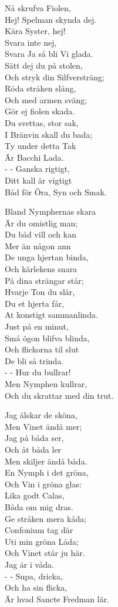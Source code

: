 \vspace{10pt}
Nå skrufva Fiolen,\\
Hej! Spelman skynda dej.\\
Kära Syster, hej!\\
Svara inte nej,\\
Svara Ja så bli Vi glada.\\
Sätt dej du på stolen,\\
Och stryk din Silfversträng;\\
Röda stråken släng,\\
Och med armen sväng;\\
Gör ej fiolen skada.\\
Du svettas, stor sak,\\
I Bränvin skall du bada;\\
Ty under detta Tak\\
Är Bacchi Lada.\\
-  -  Ganska rigtigt,\\
Ditt kall är vigtigt\\
Båd för Öra, Syn och Smak.\par
\vspace{10pt}
Bland Nymphernas skara\\
Är du omistlig man;\\
Du båd vill och kan\\
Mer än någon ann\\
De unga hjertan binda,\\
Och kärlekens snara\\
På dina strängar står;\\
Hvarje Ton du slår,\\
Du et hjerta får,\\
At konstigt sammanlinda.\\
Just på en minut,\\
Små ögon blifva blinda,\\
Och flickorna til slut\\
De bli så trinda.\\
-  -  Hur du bullrar!\\
Men Nymphen kullrar,\\
Och du skrattar med din trut.\par
\vspace{10pt}
Jag älskar de sköna,\\
Men Vinet ändå mer;\\
Jag på båda ser,\\
Och åt båda ler\\
Men skiljer ändå båda.\\
En Nymph i det gröna,\\
Och Vin i gröna glas:\\
Lika godt Calas,\\
Båda om mig dras.\\
Ge stråken mera kåda;\\
Confonium tag där\\
Uti min gröna Låda;\\
Och Vinet står ju här.\\
Jag är i våda.\\
-  -  Supa, dricka,\\
Och ha sin flicka,\\
Är hvad Sancte Fredman lär.
